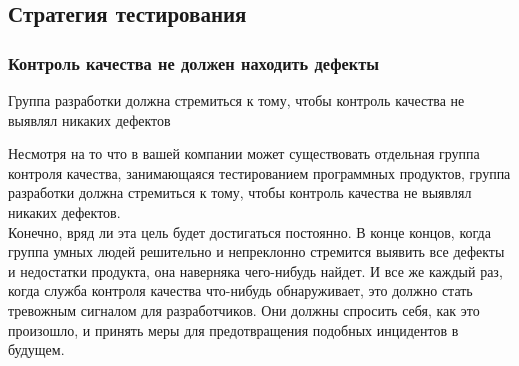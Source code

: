 \documentclass{../industrial-development}
\begin{document}
\subsection{Стратегия тестирования}
\begin{frame} \frametitle{Контроль качества не должен находить дефекты}
  \begin{block}{}
	Группа разработки должна стремиться к тому, чтобы контроль качества не выявлял никаких дефектов
  \end{block}
\end{frame}
\lecturenotes
Несмотря на то что в вашей компании может существовать отдельная группа контроля качества, занимающаяся тестированием программных продуктов, группа разработки должна стремиться к тому, чтобы контроль качества не выявлял никаких дефектов.\\
Конечно, вряд ли эта цель будет достигаться постоянно. В конце концов, когда группа умных людей решительно и непреклонно стремится выявить все дефекты и недостатки продукта, она наверняка чего-нибудь найдет. И все же каждый раз, когда служба контроля качества что-нибудь обнаруживает, это должно стать тревожным сигналом для
разработчиков. Они должны спросить себя, как это произошло, и принять меры для предотвращения подобных инцидентов в будущем.
\end{document}
